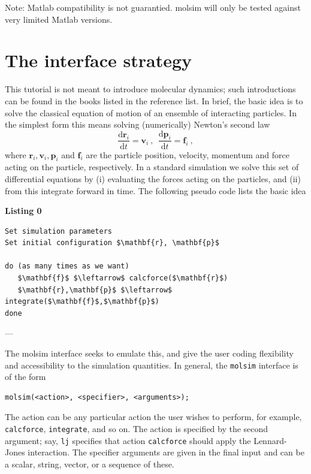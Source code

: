 \documentclass[11pt]{article}
\begin{document}
\bigskip

\noindent Note: Matlab compatibility is not guarantied. \textsf{molsim} will
only be tested against very limited Matlab versions.

\section{The interface strategy}
This tutorial is not meant to introduce molecular dynamics; such introductions
can be found in the books listed in the reference list. In brief, the basic idea
is to solve the classical equation of motion of an ensemble of interacting
particles. In the simplest form this means solving (numerically) Newton's second
law
\begin{equation}
  \frac{\mathrm{d}\mathbf{r}_i}{\mathrm{d} t} = \mathbf{v}_i \ , \ \
  \frac{\mathrm{d}\mathbf{p}_i}{\mathrm{d} t} = \mathbf{f}_i \ ,
\end{equation}
where $\mathbf{r}_i, \mathbf{v}_i, \mathbf{p}_i$ and $\mathbf{f}_i$ are the
particle position, velocity, momentum and force acting on the particle, respectively. In a
standard simulation we solve this set of differential equations by (i)
evaluating the forces acting on the particles, and (ii) from this integrate
forward in time. The following pseudo code lists the basic idea

\bigskip

\clearpage

\noindent \textbf{Listing 0}
\begin{lstlisting}
Set simulation parameters
Set initial configuration $\mathbf{r}, \mathbf{p}$

do (as many times as we want)
   $\mathbf{f}$ $\leftarrow$ calcforce($\mathbf{r}$)
   $\mathbf{r},\mathbf{p}$ $\leftarrow$ integrate($\mathbf{f}$,$\mathbf{p}$)
done
\end{lstlisting}
---

\noindent The \textsf{molsim} interface seeks to emulate this, and give the user
coding flexibility and accessibility to the simulation quantities. In general,
the \verb!molsim! interface is of the form
\begin{verbatim}
molsim(<action>, <specifier>, <arguments>);
\end{verbatim}
The action can be any particular action the user wishes to perform, for example,
\verb!calcforce!, \verb!integrate!, and so on. The action is specified by the
second argument; say, \verb!lj! specifies that action \verb!calcforce! should
apply the Lennard-Jones interaction. The specifier arguments are given in the
final input and can be a scalar, string, vector, or a sequence of these.
\end{document}
